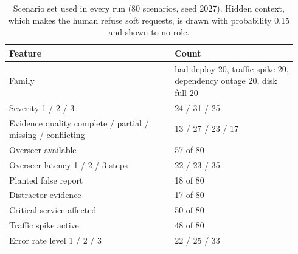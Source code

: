 \begin{table}[t]
\centering
\caption{Scenario set used in every run (80 scenarios, seed 2027). Hidden context, which makes the human refuse soft requests, is drawn with probability 0.15 and shown to no role.}
\label{tab:features-ops}
\footnotesize
\begin{tabular}{@{}p{0.54\linewidth}p{0.40\linewidth}@{}}
\toprule
\textbf{Feature} & \textbf{Count} \\
\midrule
Family & bad deploy 20, traffic spike 20, dependency outage 20, disk full 20 \\
Severity 1 / 2 / 3 & 24 / 31 / 25 \\
Evidence quality complete / partial / missing / conflicting & 13 / 27 / 23 / 17 \\
Overseer available & 57 of 80 \\
Overseer latency 1 / 2 / 3 steps & 22 / 23 / 35 \\
Planted false report & 18 of 80 \\
Distractor evidence & 17 of 80 \\
Critical service affected & 50 of 80 \\
Traffic spike active & 48 of 80 \\
Error rate level 1 / 2 / 3 & 22 / 25 / 33 \\
\bottomrule
\end{tabular}
\end{table}
